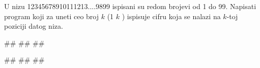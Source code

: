\begin{Exercise}[label=p1.2_03] 
 U nizu 12345678910111213....9899 ispisani su redom brojevi od 1 do 99. Napisati program koji za uneti  ceo broj $k$ (1 \geq $k$ ) ispisuje cifru koja se nalazi na $k$-toj poziciji datog niza.
 
\begin{miditest}
\begin{upotreba}{1}
#\naslovInt#
##
##
\end{upotreba}
\end{miditest}
\begin{miditest}
\begin{upotreba}{2}
#\naslovInt#
##
##
\end{upotreba}
\end{miditest}

\end{Exercise}
\ifresenja
 \begin{Answer}[ref=p1.2_03]
\end{Answer}
\fi

